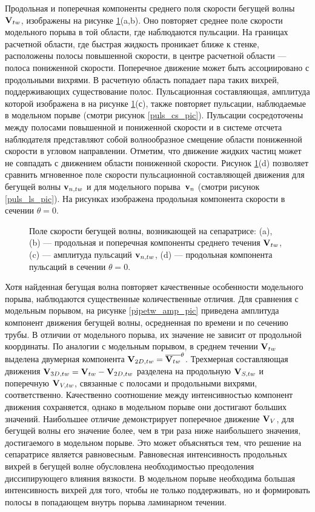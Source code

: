 Продольная и поперечная компоненты среднего поля скорости бегущей волны $\mathbf{V}_{tw}$, изображены на рисунке \ref{pipetw_pic}(a,b). Оно повторяет среднее поле скорости модельного порыва в той области, где наблюдаются пульсации. На границах расчетной области, где быстрая жидкость проникает ближе к стенке, расположены полосы повышенной скорости, в центре расчетной области --- полоса пониженной скорости. Поперечное движение может быть ассоциировано с продольными вихрями. В расчетную область попадает пара таких вихрей, поддерживающих существование полос. Пульсационная составляющая, амплитуда которой изображена в на рисунке \ref{pipetw_pic}(с), также повторяет пульсации, наблюдаемые в модельном порыве (смотри рисунок \ref{puls_cs_pic}). Пульсации сосредоточены между полосами повышенной и пониженной скорости и в системе отсчета наблюдателя представляют собой волнообразное смещение области пониженной скорости в угловом направлении. Отметим, что движение жидких частиц может не совпадать с движением области пониженной скорости. Рисунок \ref{pipetw_pic}(d) позволяет сравнить мгновенное поле скорости пульсационной составляющей движения для бегущей волны $\mathbf{v}_{n,tw}$ и для модельного порыва~$\mathbf{v}_n$ (смотри рисунок \ref{puls_ls_pic}). На рисунках изображена продольная компонента скорости в сечении $\theta = 0$. 
 

\begin{figure}
\caption{Поле скорости бегущей волны, возникающей на сепаратрисе: (a), (b) --- продольная и поперечная компоненты среднего течения $\mathbf{V}_{tw}$, (c) --- амплитуда пульсаций $\mathbf{v}_{n,tw}$, (d) --- продольная компонента пульсаций в сечении $\theta = 0$.}
\label{pipetw_pic}
\end{figure}

Хотя найденная бегущая волна повторяет качественные особенности модельного порыва, наблюдаются существенные количественные отличия. Для сравнения с модельным порывом, на рисунке \ref{pipetw_amp_pic} приведена амплитуда компонент движения бегущей волны, осредненная по времени и по сечению трубы. В отличии от модельного порыва, их значение не зависит от продольной координаты. По аналогии с модельным порывом, в среднем течении $\mathbf{V}_{tw}$ выделена двумерная компонента $\mathbf{V}_{2D,tw} = \overline{\mathbf{V}_{tw}}^\theta$. Трехмерная составляющая движения $\mathbf{V}_{3D,tw} = \mathbf{V}_{tw} - \mathbf{V}_{2D,tw}$ разделена на продольную $\mathbf{V}_{S,tw}$ и поперечную $\mathbf{V}_{V,tw}$, связанные с полосами и продольными вихрями, соответственно. Качественно соотношение между интенсивностью компонент движения сохраняется, однако в модельном порыве они достигают больших значений. Наибольшее отличие демонстрирует поперечное движение $\mathbf{V}_V$, для бегущей волны его значение более, чем в три раза ниже наибольшего значения, достигаемого в модельном порыве. Это может объясняться тем, что решение на сепаратрисе является равновесным. Равновесная интенсивность продольных вихрей в бегущей волне обусловлена необходимостью преодоления диссипирующего влияния вязкости. В модельном порыве необходима большая интенсивность вихрей для того, чтобы не только поддерживать, но и формировать полосы в попадающем внутрь порыва ламинарном течении. 


